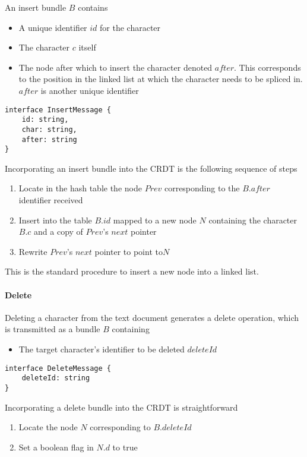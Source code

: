 \documentclass[12pt,a4paper,twoside,openright]{report}
\begin{document}
				An insert bundle $B$ contains
				\begin{itemize}
					\item A unique identifier $id$ for the character
					\item The character $c$ itself
					\item The node after which to insert the character denoted $after$. This corresponds to the position in the linked list at which the character needs to be spliced in. $after$ is another unique identifier
				\end{itemize}
			
\vspace{3mm}	
\begin{lstlisting}[caption=Insert Bundle Type Signature]
interface InsertMessage {
    id: string,
    char: string,
    after: string
}
\end{lstlisting}
				
				Incorporating an insert bundle into the CRDT is the following sequence of steps
				\begin{enumerate}
					\item Locate in the hash table the node $Prev$ corresponding to the $B.after$ identifier received
					\item Insert into the table $B.id$ mapped to a new node $N$ containing the character $B.c$ and a copy of $Prev$'s $next$ pointer
					\item Rewrite $Prev$'s $next$ pointer to point to$N$
				\end{enumerate}
				This is the standard procedure to insert a new node into a linked list.
				
			\paragraph{Delete}
				Deleting a character from the text document generates a delete operation, which is transmitted as a bundle $B$ containing
				\begin{itemize}
					\item The target character's identifier to be deleted $deleteId$
				\end{itemize}
				
\vspace{3mm}
\begin{lstlisting}[caption=Delete Bundle Type Signature]
interface DeleteMessage {
    deleteId: string
}
\end{lstlisting}				
				
				Incorporating a delete bundle into the CRDT is straightforward
				\begin{enumerate}
					\item Locate the node $N$ corresponding to $B.deleteId$
					\item Set a boolean flag in $N.d$ to true
				\end{enumerate}
				
\end{document}
